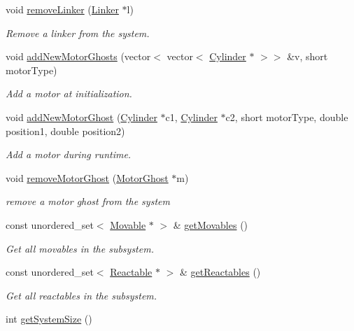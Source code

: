 \begin{DoxyCompactItemize}
void \hyperlink{classSubSystem_ab9855ef25754ca903fc8039646fc6175}{remove\+Linker} (\hyperlink{classLinker}{Linker} $\ast$l)
\begin{DoxyCompactList}\small\item\em Remove a linker from the system. \end{DoxyCompactList}\item 
void \hyperlink{classSubSystem_a0f9e863b6c639fe5ee2d321c24085146}{add\+New\+Motor\+Ghosts} (vector$<$ vector$<$ \hyperlink{classCylinder}{Cylinder} $\ast$ $>$$>$ \&v, short motor\+Type)
\begin{DoxyCompactList}\small\item\em Add a motor at initialization. \end{DoxyCompactList}\item 
void \hyperlink{classSubSystem_aeb47884d24b1e2f6df9225f75ae675f0}{add\+New\+Motor\+Ghost} (\hyperlink{classCylinder}{Cylinder} $\ast$c1, \hyperlink{classCylinder}{Cylinder} $\ast$c2, short motor\+Type, double position1, double position2)
\begin{DoxyCompactList}\small\item\em Add a motor during runtime. \end{DoxyCompactList}\item 
void \hyperlink{classSubSystem_acdfe4026f3baf5b09071f2abc687df9c}{remove\+Motor\+Ghost} (\hyperlink{classMotorGhost}{Motor\+Ghost} $\ast$m)
\begin{DoxyCompactList}\small\item\em remove a motor ghost from the system \end{DoxyCompactList}\item 
const unordered\+\_\+set$<$ \hyperlink{classMovable}{Movable} $\ast$ $>$ \& \hyperlink{classSubSystem_acac40388fed2315149a5e30a481f495c}{get\+Movables} ()
\begin{DoxyCompactList}\small\item\em Get all movables in the subsystem. \end{DoxyCompactList}\item 
const unordered\+\_\+set$<$ \hyperlink{classReactable}{Reactable} $\ast$ $>$ \& \hyperlink{classSubSystem_afc90cc477977cad9ba0d963eeacadc0a}{get\+Reactables} ()
\begin{DoxyCompactList}\small\item\em Get all reactables in the subsystem. \end{DoxyCompactList}\item 
int \hyperlink{classSubSystem_af7062aeb03076cfd96446921682381ac}{get\+System\+Size} ()
$$
\end{DoxyCompactItemize}
